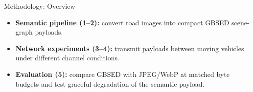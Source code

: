 \documentclass[aspectratio=169]{beamer}
\begin{document}
\begin{frame}{Methodology: Overview}
\begin{center}
{%
}
\end{center}

\vspace{0.35cm}

\begin{itemize}

    \item \textbf{Semantic pipeline (1–2):}
    convert road images into compact GBSED scene-graph payloads.

    \item \textbf{Network experiments (3–4):}
    transmit payloads between moving vehicles under different channel conditions.

    \item \textbf{Evaluation (5):}
    compare GBSED with JPEG/WebP at matched byte budgets and test
    graceful degradation of the semantic payload.

\end{itemize}

\end{frame}






\end{document}
